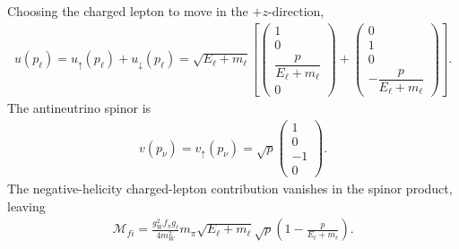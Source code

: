 Choosing the charged lepton to move in the \(+z\)-direction,
\begin{align}
u(p_\ell)
=
u_\uparrow(p_\ell)+u_\downarrow(p_\ell)
=
\sqrt{E_\ell+m_\ell}
\left[
\begin{pmatrix}
1 \\
0 \\
\dfrac{p}{E_\ell+m_\ell} \\
0
\end{pmatrix}
+
\begin{pmatrix}
0 \\
1 \\
0 \\
-\dfrac{p}{E_\ell+m_\ell}
\end{pmatrix}
\right].
\end{align}
The antineutrino spinor is
\begin{align}
v(p_\nu)
=
v_\uparrow(p_\nu)
=
\sqrt{p}
\begin{pmatrix}
1 \\
0 \\
-1 \\
0
\end{pmatrix}.
\end{align}
The negative-helicity charged-lepton contribution vanishes in the spinor
product, leaving
\begin{align}
\mathcal{M}_{fi}
=
\frac{g_W^2 f_\pi g_\ell}{4m_W^2}
m_\pi
\sqrt{E_\ell+m_\ell}\sqrt{p}
\left(
1-\frac{p}{E_\ell+m_\ell}
\right).
\end{align}

